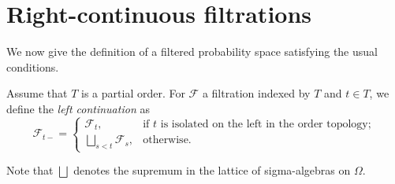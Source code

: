 








\section{Right-continuous filtrations}

We now give the definition of a filtered probability space satisfying the usual conditions.


\begin{definition}\label{def:leftLimitFiltration}
Assume that $T$ is a partial order. For $\mathcal{F}$ a filtration indexed by $T$ and $t \in T$, we define the \emph{left continuation} as
$$\mathcal{F}_{t-} =
  \begin{cases}
    \mathcal{F}_t, & \text{if $t$ is isolated on the left in the order topology}; \\
    \bigsqcup_{s < t} \mathcal{F}_s, & \text{otherwise}.
  \end{cases}
$$

Note that $\bigsqcup$ denotes the supremum in the lattice of sigma-algebras on $\Omega$.
\end{definition}








































